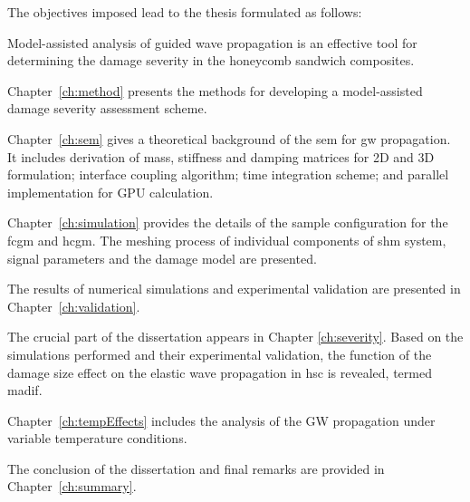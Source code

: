 The objectives imposed lead to the thesis formulated as follows:
\begin{thesis*}  
	Model-assisted analysis of guided wave propagation is an effective tool for determining the damage severity in the honeycomb sandwich composites.
\label{thesis}
\end{thesis*}

Chapter~\ref{ch:method} presents the methods for developing a model-assisted damage severity assessment scheme.

Chapter~\ref{ch:sem} gives a theoretical background of the \ac{sem} for \ac{gw} propagation.
It includes derivation of mass, stiffness and damping matrices for 2D and 3D formulation; interface coupling algorithm; time integration scheme; and parallel implementation for GPU calculation.

Chapter~\ref{ch:simulation} provides the details of the sample configuration for the \ac{fcgm} and \ac{hcgm}.
The meshing process of individual components of \ac{shm} system, signal parameters and the damage model are presented.

The results of numerical simulations and experimental validation are presented in Chapter~\ref{ch:validation}.

The crucial part of the dissertation appears in Chapter \ref{ch:severity}. Based on the simulations performed and their experimental validation, the function of the damage size effect on the elastic wave propagation in \ac{hsc} is revealed, termed \ac{madif}.

Chapter~\ref{ch:tempEffects} includes the analysis of the GW propagation under variable temperature conditions.

The conclusion of the dissertation and final remarks are provided in Chapter~\ref{ch:summary}.

